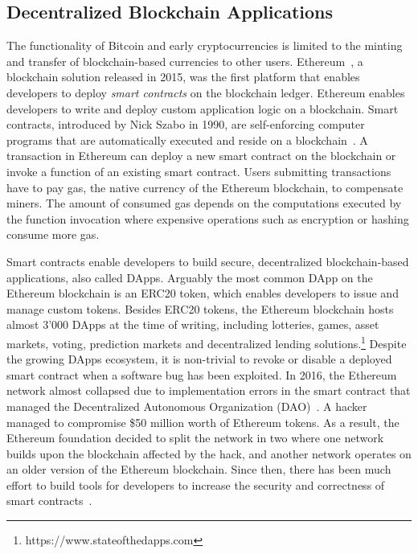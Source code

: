\subsection{Decentralized Blockchain Applications}
The functionality of Bitcoin and early cryptocurrencies is limited to the minting and transfer of blockchain-based currencies to other users.
Ethereum~\cite{wood2014ethereum}, a blockchain solution released in 2015, was the first platform that enables developers to deploy \emph{smart contracts} on the blockchain ledger.
Ethereum enables developers to write and deploy custom application logic on a blockchain.
Smart contracts, introduced by Nick Szabo in 1990, are self-enforcing computer programs that are automatically executed and reside on a blockchain~\cite{szabo1996smart}.
A transaction in Ethereum can deploy a new smart contract on the blockchain or invoke a function of an existing smart contract.
Users submitting transactions have to pay gas, the native currency of the Ethereum blockchain, to compensate miners.
The amount of consumed gas depends on the computations executed by the function invocation where expensive operations such as encryption or hashing consume more gas.


Smart contracts enable developers to build secure, decentralized blockchain-based applications, also called DApps.
Arguably the most common DApp on the Ethereum blockchain is an ERC20 token, which enables developers to issue and manage custom tokens.
Besides ERC20 tokens, the Ethereum blockchain hosts almost 3'000 DApps at the time of writing, including lotteries, games, asset markets, voting, prediction markets and decentralized lending solutions.\footnote{https://www.stateofthedapps.com}
Despite the growing DApps ecosystem, it is non-trivial to revoke or disable a deployed smart contract when a software bug has been exploited.
In 2016, the Ethereum network almost collapsed due to implementation errors in the smart contract that managed the Decentralized Autonomous Organization (DAO)~\cite{mehar2019understanding}.
A hacker managed to compromise \$50 million worth of Ethereum tokens.
As a result, the Ethereum foundation decided to split the network in two where one network builds upon the blockchain affected by the hack, and another network operates on an older version of the Ethereum blockchain.
Since then, there has been much effort to build tools for developers to increase the security and correctness of smart contracts~\cite{breidenbach2018enter}.

